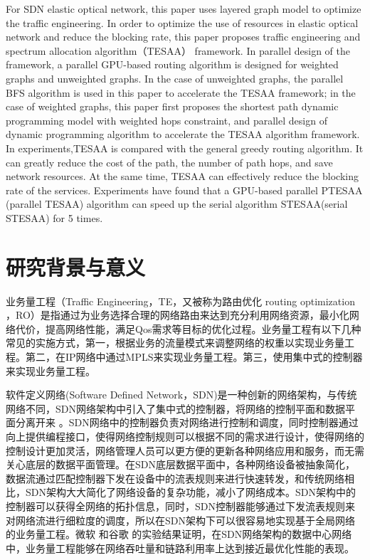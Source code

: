 \documentclass[master]{thesis-uestc}
\begin{document}
\begin{englishabstract}
For SDN elastic optical network, this paper uses layered graph model to optimize the traffic engineering. In order to optimize the use of resources in elastic optical network and reduce the blocking rate, this paper proposes traffic engineering and spectrum allocation algorithm（TESAA） framework. In parallel design of the framework, a parallel GPU-based routing algorithm is designed for weighted graphs and unweighted graphs. In the case of unweighted graphs, the parallel BFS algorithm is used in this paper to accelerate the TESAA framework; in the case of weighted graphs, this paper first proposes the shortest path dynamic programming model with weighted hops constraint, and parallel design of dynamic programming algorithm to accelerate the TESAA algorithm framework. In experiments,TESAA is compared with the general greedy routing algorithm. It can greatly reduce the cost of the path, the number of path hops, and save network resources. At the same time, TESAA can effectively reduce the blocking rate of the services. Experiments have found that a GPU-based parallel PTESAA (parallel TESAA) algorithm can speed up the serial algorithm STESAA(serial STESAA) for 5 times.


\end{englishabstract}
\thesistableofcontents
\thesisfigurelist
\thesistablelist
\thesischapterexordium
\section{研究背景与意义}

业务量工程（Traffic Engineering，TE，又被称为路由优化 routing optimization ，RO）是指通过为业务选择合理的网络路由来达到充分利用网络资源，最小化网络代价，提高网络性能，满足Qos需求等目标的优化过程。业务量工程有以下几种常见的实施方式，第一，根据业务的流量模式来调整网络的权重以实现业务量工程。第二，在IP网络中通过MPLS来实现业务量工程。第三，使用集中式的控制器来实现业务量工程。

软件定义网络(Software Defined Network，SDN)是一种创新的网络架构，与传统网络不同，SDN网络架构中引入了集中式的控制器，将网络的控制平面和数据平面分离开来 。SDN网络中的控制器负责对网络进行控制和调度，同时控制器通过向上提供编程接口，使得网络控制规则可以根据不同的需求进行设计，使得网络的控制设计更加灵活，网络管理人员可以更方便的更新各种网络应用和服务，而无需关心底层的数据平面管理。在SDN底层数据平面中，各种网络设备被抽象简化，数据流通过匹配控制器下发在设备中的流表规则来进行快速转发，和传统网络相比，SDN架构大大简化了网络设备的复杂功能，减小了网络成本。SDN架构中的控制器可以获得全网络的拓扑信息，同时，SDN控制器能够通过下发流表规则来对网络流进行细粒度的调度，所以在SDN架构下可以很容易地实现基于全局网络的业务量工程。微软 和谷歌 的实验结果证明，在SDN网络架构的数据中心网络中，业务量工程能够在网络吞吐量和链路利用率上达到接近最优化性能的表现。
\end{document}
